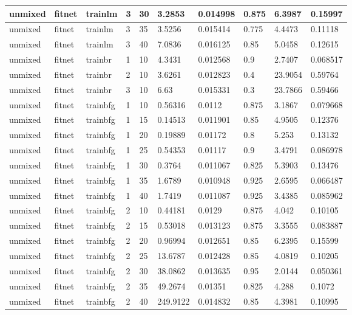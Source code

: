 \begin{longtable}{lllllllll}
unmixed & fitnet & trainlm & 3 & 30 & 3.2853 & 0.014998 & 0.875 & 6.3987 & 0.15997 \\ \hline 
unmixed & fitnet & trainlm & 3 & 35 & 3.5256 & 0.015414 & 0.775 & 4.4473 & 0.11118 \\ \hline 
unmixed & fitnet & trainlm & 3 & 40 & 7.0836 & 0.016125 & 0.85 & 5.0458 & 0.12615 \\ \hline 
unmixed & fitnet & trainbr & 1 & 10 & 4.3431 & 0.012568 & 0.9 & 2.7407 & 0.068517 \\ \hline 
unmixed & fitnet & trainbr & 2 & 10 & 3.6261 & 0.012823 & 0.4 & 23.9054 & 0.59764 \\ \hline 
unmixed & fitnet & trainbr & 3 & 10 & 6.63 & 0.015331 & 0.3 & 23.7866 & 0.59466 \\ \hline 
unmixed & fitnet & trainbfg & 1 & 10 & 0.56316 & 0.0112 & 0.875 & 3.1867 & 0.079668 \\ \hline 
unmixed & fitnet & trainbfg & 1 & 15 & 0.14513 & 0.011901 & 0.85 & 4.9505 & 0.12376 \\ \hline 
unmixed & fitnet & trainbfg & 1 & 20 & 0.19889 & 0.01172 & 0.8 & 5.253 & 0.13132 \\ \hline 
unmixed & fitnet & trainbfg & 1 & 25 & 0.54353 & 0.01117 & 0.9 & 3.4791 & 0.086978 \\ \hline 
unmixed & fitnet & trainbfg & 1 & 30 & 0.3764 & 0.011067 & 0.825 & 5.3903 & 0.13476 \\ \hline 
unmixed & fitnet & trainbfg & 1 & 35 & 1.6789 & 0.010948 & 0.925 & 2.6595 & 0.066487 \\ \hline 
unmixed & fitnet & trainbfg & 1 & 40 & 1.7419 & 0.011087 & 0.925 & 3.4385 & 0.085962 \\ \hline 
unmixed & fitnet & trainbfg & 2 & 10 & 0.44181 & 0.0129 & 0.875 & 4.042 & 0.10105 \\ \hline 
unmixed & fitnet & trainbfg & 2 & 15 & 0.53018 & 0.013123 & 0.875 & 3.3555 & 0.083887 \\ \hline 
unmixed & fitnet & trainbfg & 2 & 20 & 0.96994 & 0.012651 & 0.85 & 6.2395 & 0.15599 \\ \hline 
unmixed & fitnet & trainbfg & 2 & 25 & 13.6787 & 0.012428 & 0.85 & 4.0819 & 0.10205 \\ \hline 
unmixed & fitnet & trainbfg & 2 & 30 & 38.0862 & 0.013635 & 0.95 & 2.0144 & 0.050361 \\ \hline 
unmixed & fitnet & trainbfg & 2 & 35 & 49.2674 & 0.01351 & 0.825 & 4.288 & 0.1072 \\ \hline 
unmixed & fitnet & trainbfg & 2 & 40 & 249.9122 & 0.014832 & 0.85 & 4.3981 & 0.10995 \\ \hline 

\end{longtable}
